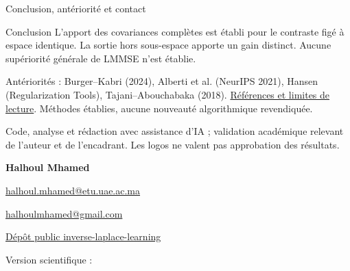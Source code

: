 \documentclass[aspectratio=169,10pt]{beamer}
\newcommand{\src}[2]{\href{\DataURL{#1}}{#2}}
\begin{document}
\begin{frame}{Conclusion, antériorité et contact}
\begin{block}{Conclusion}
L'apport des covariances complètes est établi pour le contraste figé à espace identique. La sortie hors sous-espace apporte un gain distinct. Aucune supériorité générale de LMMSE n'est établie.
\end{block}
\small
Antériorités : Burger--Kabri (2024), Alberti et al. (NeurIPS 2021), Hansen (Regularization Tools), Tajani--Abouchabaka (2018). \src{SOURCES.md}{Références et limites de lecture}. Méthodes établies, aucune nouveauté algorithmique revendiquée.
\par\vspace{2mm}
Code, analyse et rédaction avec assistance d'IA ; validation académique relevant de l'auteur et de l'encadrant. Les logos ne valent pas approbation des résultats.
\par\vspace{3mm}
\textbf{Halhoul Mhamed}\par
\href{mailto:halhoul.mhamed@etu.uae.ac.ma}{halhoul.mhamed@etu.uae.ac.ma}\par
\href{mailto:halhoulmhamed@gmail.com}{halhoulmhamed@gmail.com}\par
\href{https://github.com/halhoulmhamed-droid/inverse-laplace-learning}{Dépôt public inverse-laplace-learning}\par
\par\vspace{2mm}
{\tiny Version scientifique : \texttt{\DataCommit}}
\end{frame}
\end{document}
